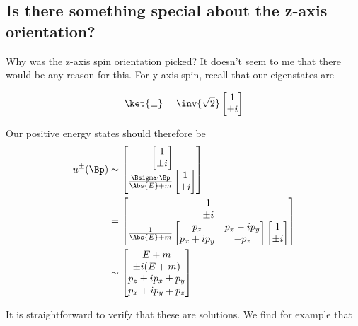 \subsection{Is there something special about the z-axis orientation?}

Why was the z-axis spin orientation picked?  It doesn't seem to me that there would be any reason for this.   For y-axis spin, recall that our eigenstates are

\begin{equation}\label{eqn:desaiDiracAdjoint:240}
\ket{\pm}
=
\inv{\sqrt{2}}
\begin{bmatrix}
1 \\
\pm i
\end{bmatrix}
\end{equation}

Our positive energy states should therefore be
\begin{align*}
u^{\pm}(\Bp) &\sim
\begin{bmatrix}
\begin{bmatrix}
1 \\
\pm i
\end{bmatrix} \\
\frac{\Bsigma \cdot \Bp}{\Abs{E} + m} 
\begin{bmatrix}
1 \\
\pm i
\end{bmatrix} 
\end{bmatrix} \\
&=
\begin{bmatrix}
1 \\
\pm i \\
\frac{1}{\Abs{E} + m} 
\begin{bmatrix}
p_z &  p_x - i p_y \\
p_x + i p_y & - p_z
\end{bmatrix}
\begin{bmatrix}
1 \\
\pm i
\end{bmatrix} 
\end{bmatrix} \\
&\sim
\begin{bmatrix}
E + m \\
\pm i (E + m) \\
p_z \pm i p_x \pm p_y \\
p_x + i p_y \mp p_z 
\end{bmatrix}
\end{align*}

It is straightforward to verify that these are solutions.  We find for example that

